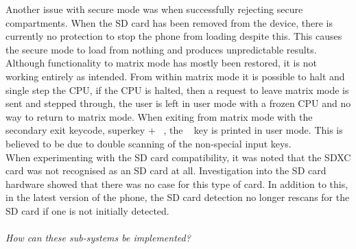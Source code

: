 Another issue with secure mode was when successfully rejecting secure compartments. When the SD card has been removed from the device, there is currently no protection to stop the phone from loading despite this.
This causes the secure mode to load from nothing and produces unpredictable results.\\
Although functionality to matrix mode has mostly been restored, it is not working entirely as intended. 
From within matrix mode it is possible to halt and single step the CPU, if the CPU is halted, then a request to leave matrix mode is sent and stepped through, the user is left in user mode with a frozen CPU and no way to return to matrix mode.
When exiting from matrix mode with the secondary exit keycode, superkey + ~, the ~ key is printed in user mode. 
This is believed to be due to double scanning of the non-special input keys.\\
When experimenting with the SD card compatibility, it was noted that the SDXC card was not recognised as an SD card at all. Investigation into the SD card hardware showed that there was no case for this type of card. 
In addition to this, in the latest version of the phone, the SD card detection no longer rescans for the SD card if one is not initially detected.\\
\\
\textit{How can these sub-systems be implemented?}\\
